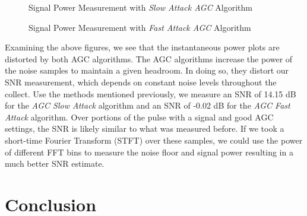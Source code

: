 \documentclass{article}
\begin{document}
\begin{figure}[H]
	\centerline{}
	\caption{Signal Power Measurement with \textit{Slow Attack AGC} Algorithm}
	\label{fig::snr_agc_slow_attack_30db_tx_atten}
\end{figure}

\begin{figure}[H]
	\centerline{}
	\caption{Signal Power Measurement with \textit{Fast Attack AGC} Algorithm}
	\label{fig::snr_agc_fast_attack_30db_tx_atten}
\end{figure}

Examining the above figures, we see that the instantaneous power plots are distorted by both AGC algorithms. The AGC algorithms increase the power of the noise samples to maintain a given headroom. In doing so, they distort our SNR measurement, which depends on constant noise levels throughout the collect. Use the methods mentioned previously, we measure an SNR of 14.15 dB for the \textit{AGC Slow Attack} algorithm and an SNR of -0.02 dB for the \textit{AGC Fast Attack} algorithm. Over portions of the pulse with a signal and good AGC settings, the SNR is likely similar to what was measured before. If we took a short-time Fourier Transform (STFT) over these samples, we could use the power of different FFT bins to measure the noise floor and signal power resulting in a much better SNR estimate. 

\section{Conclusion}
\end{document}
